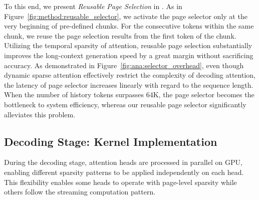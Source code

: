 To this end, we present \textit{Reusable Page Selection} in \system. As in Figure~\ref{fig:method:reusable_selector}, we activate the page selector only at the very beginning of pre-defined chunks. For the consecutive tokens within the same chunk, we reuse the page selection results from the first token of the chunk.
Utilizing the temporal sparsity of attention, reusable page selection substantially improves the long-context generation speed by a great margin without sacrificing accuracy. As demonstrated in Figure~\ref{fig:ana:selector_overhead}, even though dynamic sparse attention effectively restrict the complexity of decoding attention, the latency of page selector increases linearly with regard to the sequence length. When the number of history tokens surpasses 64K, the \naive page selector becomes the bottleneck to system efficiency, whereas our reusable page selector significantly alleviates this problem.








\subsection{Decoding Stage: Kernel Implementation}

During the decoding stage, attention heads are processed in parallel on GPU, enabling different sparsity patterns to be applied independently on each head. This flexibility enables some heads to operate with page-level sparsity while others follow the streaming computation pattern. 

